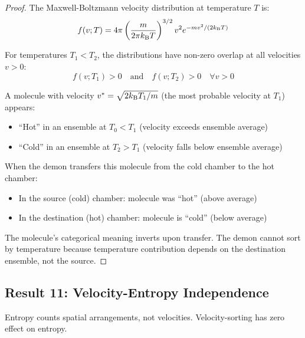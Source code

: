 \begin{proof}
The Maxwell-Boltzmann velocity distribution at temperature $T$ is:
\begin{equation}
f(v; T) = 4\pi \left(\frac{m}{2\pi k_{\mathrm{B}} T}\right)^{3/2} v^2 e^{-mv^2/(2k_{\mathrm{B}} T)}
\end{equation}

For temperatures $T_1 < T_2$, the distributions have non-zero overlap at all velocities $v > 0$:
\begin{equation}
f(v; T_1) > 0 \quad \text{and} \quad f(v; T_2) > 0 \quad \forall v > 0
\end{equation}

A molecule with velocity $v^* = \sqrt{2k_{\mathrm{B}} T_1/m}$ (the most probable velocity at $T_1$) appears:
\begin{itemize}
\item ``Hot'' in an ensemble at $T_0 < T_1$ (velocity exceeds ensemble average)
\item ``Cold'' in an ensemble at $T_2 > T_1$ (velocity falls below ensemble average)
\end{itemize}

When the demon transfers this molecule from the cold chamber to the hot chamber:
\begin{itemize}
\item In the source (cold) chamber: molecule was ``hot'' (above average)
\item In the destination (hot) chamber: molecule is ``cold'' (below average)
\end{itemize}

The molecule's categorical meaning inverts upon transfer. The demon cannot sort by temperature because temperature contribution depends on the destination ensemble, not the source.
\end{proof}

\subsection{Result 11: Velocity-Entropy Independence}

\begin{theorem}
\label{thm:velocity_entropy}
Entropy counts spatial arrangements, not velocities. Velocity-sorting has zero effect on entropy.
\end{theorem}

